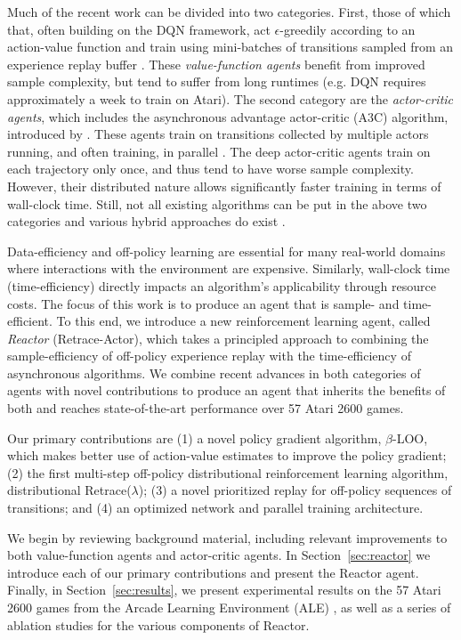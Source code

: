 \documentclass{article}
\begin{document}
Much of the recent work can be divided into two categories. First, 
those of which that, often building on the DQN framework, 
act $\epsilon$-greedily according to an action-value function and train 
using mini-batches of transitions sampled from 
an experience replay buffer \citep{van2016deep,wang2015dueling,he2016learning,anschel2017averaged}. These \textit{value-function agents} benefit from 
improved sample complexity, but tend to 
suffer from long runtimes (e.g. DQN requires approximately a week to train on 
Atari). The second category are the
\textit{actor-critic agents}, which includes the asynchronous advantage actor-critic (A3C) algorithm,
introduced by \citet{mnih2016asynchronous}. These agents train on 
transitions collected by multiple actors running, 
and often training, in parallel \citep{schulman2017proximal,vezhnevets2017feudal}. The deep actor-critic agents train on each 
trajectory only once, and thus tend to have 
worse sample complexity. However, their distributed nature allows significantly 
faster training in terms of wall-clock time.
Still, not all existing algorithms can be put in the above two categories and 
various hybrid approaches do exist 
\citep{zhao2016deep,o2016combining,gu2016q,wang2017sample}.

Data-efficiency and off-policy learning are essential for many 
real-world domains where 
interactions with the environment are expensive. Similarly, wall-clock time 
(time-efficiency) directly impacts an algorithm's 
applicability through resource costs. The focus of this work is to produce an agent that 
is sample- and time-efficient. To this end, we introduce a new reinforcement learning agent, 
called {\em Reactor} (Retrace-Actor), which 
takes a principled approach to combining the sample-efficiency of off-policy 
experience replay with the time-efficiency 
of asynchronous algorithms. We combine recent advances in both 
categories of agents with novel contributions to produce an 
agent that inherits the benefits of both and reaches state-of-the-art 
performance over 57 Atari 2600 games.

Our primary contributions are (1) a novel policy gradient algorithm, 
$\beta$-LOO, which makes better use of action-value estimates to improve the 
policy gradient; (2) the first multi-step off-policy distributional reinforcement 
learning algorithm, distributional Retrace($\lambda$); (3) a novel prioritized 
replay for off-policy sequences of transitions; and (4) an optimized network and 
parallel training architecture.

We begin by reviewing background material, including relevant improvements to 
both value-function agents and actor-critic agents. In Section~\ref{sec:reactor} 
we introduce each of our primary contributions and present the Reactor agent. 
Finally, in Section~\ref{sec:results}, 
we present experimental results on the 57 Atari 2600 games from the Arcade 
Learning Environment (ALE) \citep{bellemare2013arcade}, as well as a series of 
ablation studies for the various components of Reactor.
\end{document}
